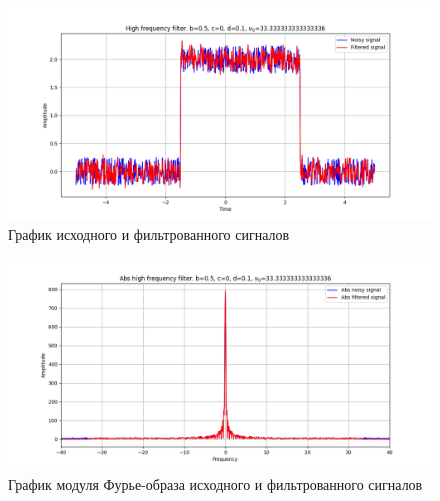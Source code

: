 \documentclass[a4paper, 16pt]{article}
\begin{document}
    \begin{figure}[!htb]
        \centering
        \includegraphics[scale=0.485]{9_u_flt_u_nohigh.png}
        \captionsetup{skip=0pt}
        \caption{График исходного и фильтрованного сигналов}
        \label{fig:fig19}
    \end{figure}
    \newpage
    \begin{figure}[!htb]
        \centering
        \includegraphics[scale=0.485]{9_abs_u_U_nohigh.png}
        \captionsetup{skip=0pt}
        \caption{График модуля Фурье-образа исходного и фильтрованного сигналов}
        \label{fig:fig20}
    \end{figure}
\end{document}
